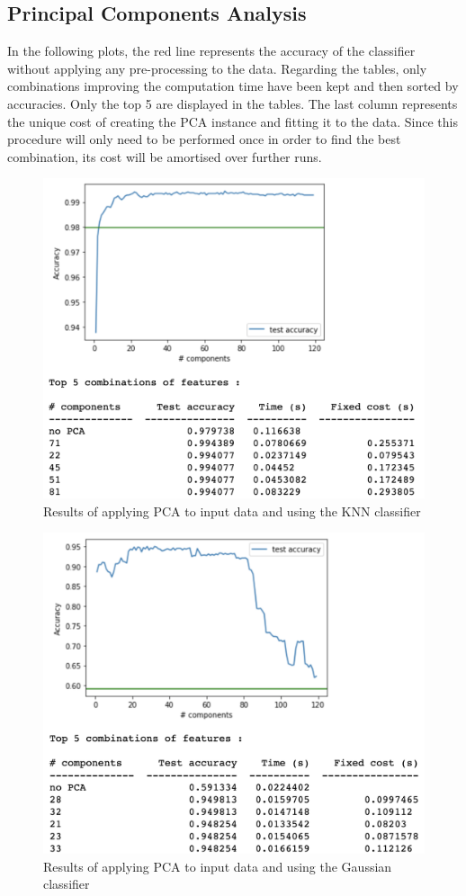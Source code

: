 \begin{appendix}
    
\chapter{Principal Components Analysis}
    \label{fs_pca}
    
    In the following plots, the red line represents the accuracy of the classifier without applying any pre-processing to the data. Regarding the tables, only combinations improving the computation time have been kept and then sorted by accuracies. Only the top 5 are displayed in the tables. The last column represents the unique cost of creating the PCA instance and fitting it to the data. Since this procedure will only need to be performed once in order to find the best combination, its cost will be amortised over further runs.
    
    \begin{figure}[!ht]
    \centering
      \includegraphics[width=0.68\linewidth]{Figures/KNN_pca.png}
      \caption{Results of applying PCA to input data and using the KNN classifier}
      \label{fig:knn_pca}
    \end{figure}
    
    \begin{figure}[!ht]
    \centering
      \includegraphics[width=0.68\linewidth]{Figures/gaussian_pca.png}
      \caption{Results of applying PCA to input data and using the Gaussian classifier}
      \label{fig:gaussian_pca}
    \end{figure}
    

\end{appendix}
